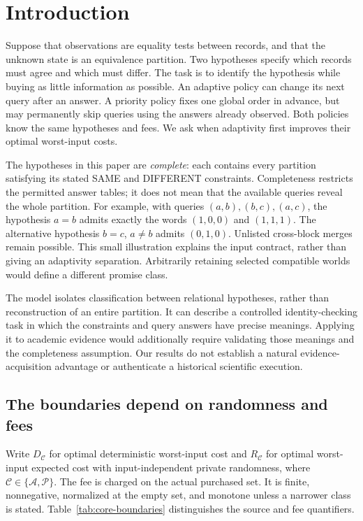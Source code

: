 \documentclass[pdflatex,sn-mathphys-num]{sn-jnl}
\theoremstyle{thmstyleone}
\theoremstyle{thmstylethree}
\theoremstyle{thmstyletwo}
\begin{document}
\section{Introduction}
\label{sec:introduction}
Suppose that observations are equality tests between records, and that the
unknown state is an equivalence partition. Two hypotheses specify which
records must agree and which must differ. The task is to identify the
hypothesis while buying as little information as possible. An adaptive
policy can change its next query after an answer. A priority policy fixes
one global order in advance, but may permanently skip queries using the
answers already observed. Both policies know the same hypotheses and fees.
We ask when adaptivity first improves their optimal worst-input costs.

The hypotheses in this paper are \emph{complete}: each contains every
partition satisfying its stated SAME and DIFFERENT constraints. Completeness
restricts the permitted answer tables; it does not mean that the available
queries reveal the whole partition. For example, with queries
$(a,b),(b,c),(a,c)$, the hypothesis $a=b$ admits exactly the words
$(1,0,0)$ and $(1,1,1)$. The alternative hypothesis $b=c$, $a\ne b$
admits $(0,1,0)$. Unlisted cross-block merges remain possible.
This small illustration explains the input contract, rather than giving
an adaptivity separation. Arbitrarily retaining selected compatible worlds
would define a different promise class.

The model isolates classification between relational hypotheses, rather
than reconstruction of an entire partition. It can describe a controlled
identity-checking task in which the constraints and query answers have
precise meanings. Applying it to academic evidence would additionally
require validating those meanings and the completeness assumption. Our
results do not establish a natural evidence-acquisition advantage or
authenticate a historical scientific execution.

\subsection{The boundaries depend on randomness and fees}
Write $D_{\mathcal C}$ for optimal deterministic worst-input cost and
$R_{\mathcal C}$ for optimal worst-input expected cost with input-independent
private randomness, where $\mathcal C\in\{\mathcal A,\mathcal P\}$.
The fee is charged on the actual purchased set. It is finite, nonnegative,
normalized at the empty set, and monotone unless a narrower class is stated.
Table~\ref{tab:core-boundaries} distinguishes the source and fee quantifiers.
\end{document}
